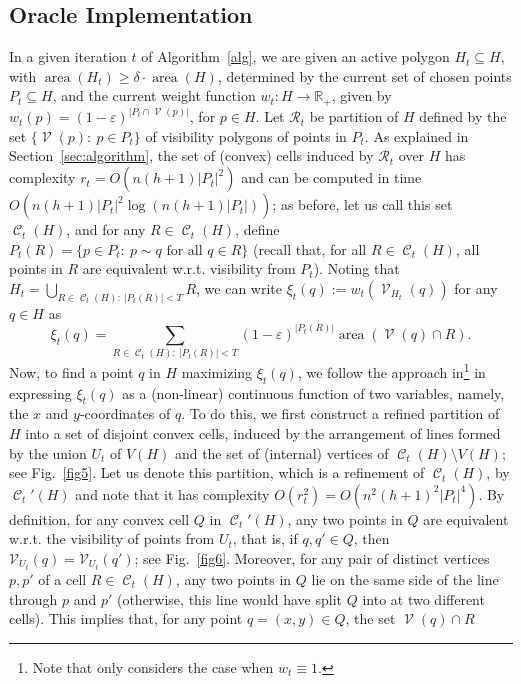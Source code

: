 \documentclass[a4paper,11pt]{article}
\def\RR{\mathbb R}
\def\cC{\mathcal C}
\def\cR{\mathcal R}
\def\cV{\mathcal V}
\def\eps{\varepsilon}
\def\sees{\sim}
\newcommand{\area}{\operatorname{area}}
\newcommand{\cells}{\operatorname{\cC}}
\newcommand{\Vis}{\operatorname{\cV}}
\begin{document}
\subsection{Oracle Implementation}
In a given iteration $t$ of Algorithm~\ref{alg}, we are given an active polygon $H_t\subseteq H$, with $\area(H_t)\ge\delta\cdot\area(H)$, determined by the current set of chosen points $P_t\subseteq H$, and the current weight function $w_t:H\to\RR_+$, given by $ w_t(p)=(1-\eps)^{|P_t\cap \Vis(p)|}$, for $p\in H$. Let $\cR_t$ be partition of $H$ defined by the set $\{\Vis(p):~p\in P_t\}$ of visibility polygons of points in $P_t$. As explained in Section~\ref{sec:algorithm}, the set of (convex) cells induced by $\cR_t$ over $H$ has complexity $r_t=O(n(h+1)|P_t|^2)$ and can be computed in time $O(n(h+1)|P_t|^2\log(n(h+1)|P_t|))$; as before, let us call this set $\cells_t(H)$, and for any $R\in\cells_t(H)$, define $P_t(R)=\{p\in P_t:~p\sees q\text{ for all } q\in R\}$ (recall that, for all $R\in\cells_t(H)$, all points in $R$ are equivalent w.r.t. visibility from $P_t$). Noting that $H_t=\bigcup_{R\in\cells_t(H):~|P_t(R)|<T}R$, we can write $\xi_t(q):=w_t(\Vis_{H_t}(q))$ for any $q\in H$ as
\begin{equation}\label{vis-wt}                                                                                                    
\xi_t(q)=\sum_{R\in \cells_t(H):~|P_t(R)|<T}(1-\eps)^{|P_t(R)|}\area(\Vis(q)\cap R).
\end{equation}
Now, to find a point $q$ in $H$ maximizing $\xi_t(q)$, we follow the approach in\footnote{Note that \cite{NT94}  only considers the case when $w_t\equiv 1$.} %
\cite{NT94} in expressing $\xi_t(q)$ as a (non-linear) continuous function of two variables, namely, the $x$ and $y$-coordinates of $q$. To do this, we first construct a refined partition of $H$ into a set of disjoint convex cells, induced by the arrangement of lines formed by the union $U_t$ of  $V(H)$ and the set of (internal) vertices of $\cells_t(H)\setminus V(H)$; see Fig.~\ref{fig5}. Let us denote this partition, which is a refinement of $\cells_t(H)$, by $\cells_t'(H)$ and note that it has complexity $O(r_t^2)=O(n^2(h+1)^2|P_t|^4)$. By definition, for any convex cell $Q$ in $\cells_t'(H)$, any two points in $Q$ are equivalent w.r.t. the visibility of points from $U_t$, that is, if $q,q'\in Q$, then $\cV_{U_t}(q)=\cV_{U_t}(q')$; see Fig.~\ref{fig6}. Moreover, for any pair of distinct vertices $p,p'$ of a cell $R\in\cells_t(H)$, any two points in $Q$ lie on the same side of the line through $p$ and $p'$ (otherwise, this line would have split $Q$ into at two different cells). This implies that, for any point $q=(x,y)\in Q$, the set $\Vis(q)\cap R$
\end{document}
